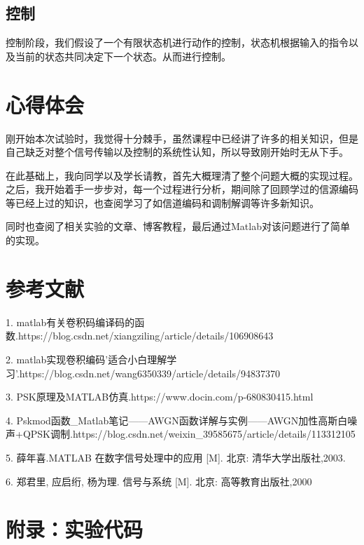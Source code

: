\documentclass{../source/Experiment}
\begin{document}
        \subsection{控制}
            控制阶段，我们假设了一个有限状态机进行动作的控制，状态机根据输入的指令以及当前的状态共同决定下一个状态。从而进行控制。

        \section{心得体会}
        刚开始本次试验时，我觉得十分棘手，虽然课程中已经讲了许多的相关知识，但是自己缺乏对整个信号传输以及控制的系统性认知，所以导致刚开始时无从下手。

        在此基础上，我向同学以及学长请教，首先大概理清了整个问题大概的实现过程。之后，我开始着手一步步对，每一个过程进行分析，期间除了回顾学过的信源编码等已经上过的知识，也查阅学习了如信道编码和调制解调等许多新知识。
        
        同时也查阅了相关实验的文章、博客教程，最后通过Matlab对该问题进行了简单的实现。

        \section{参考文献}

        1. matlab有关卷积码编译码的函数.https://blog.csdn.net/xiangziling/article/details/106908643

        2. matlab实现卷积编码'适合小白理解学习'.https://blog.csdn.net/wang6350339/article/details/94837370

        3. PSK原理及MATLAB仿真.https://www.docin.com/p-680830415.html

        4. Pskmod函数\_Matlab笔记——AWGN函数详解与实例——AWGN加性高斯白噪声+QPSK调制.https://blog.csdn.net/weixin\_39585675/article/details/113312105

        5. 薛年喜.MATLAB 在数字信号处理中的应用 [M]. 北京: 清华大学出版社,2003.

        6. 郑君里, 应启绗, 杨为理. 信号与系统 [M]. 北京: 高等教育出版社,2000

        \section{附录：实验代码}
        
\end{document}
